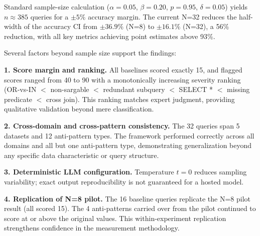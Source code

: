 \documentclass[conference]{IEEEtran}
\begin{document}
\begin{table}[t]
\caption{Confidence Intervals: N=8 vs.\ N=32}
\label{tab:intervals}
\centering
\small
{}
\end{table}

Standard sample-size calculation ($\alpha = 0.05$, $\beta = 0.20$, $p = 0.95$, $\delta = 0.05$) yields $n \approx 385$ queries for a $\pm5\%$ accuracy margin. The current N=32 reduces the half-width of the accuracy CI from $\pm36.9\%$ (N=8) to $\pm16.1\%$ (N=32), a 56\% reduction, with all key metrics achieving point estimates above 93\%.

Several factors beyond sample size support the findings:

\noindent\textbf{1. Score margin and ranking.} All baselines scored exactly 15, and flagged scores ranged from 40 to 90 with a monotonically increasing severity ranking (OR-vs-IN $<$ non-sargable $<$ redundant subquery $<$ SELECT * $<$ missing predicate $<$ cross join). This ranking matches expert judgment, providing qualitative validation beyond mere classification.

\noindent\textbf{2. Cross-domain and cross-pattern consistency.} The 32 queries span 5 datasets and 12 anti-pattern types. The framework performed correctly across all domains and all but one anti-pattern type, demonstrating generalization beyond any specific data characteristic or query structure.

\noindent\textbf{3. Deterministic LLM configuration.} Temperature $t=0$ reduces sampling variability; exact output reproducibility is not guaranteed for a hosted model.

\noindent\textbf{4. Replication of N=8 pilot.} The 16 baseline queries replicate the N=8 pilot result (all scored 15). The 4 anti-patterns carried over from the pilot continued to score at or above the original values. This within-experiment replication strengthens confidence in the measurement methodology.
\end{document}
